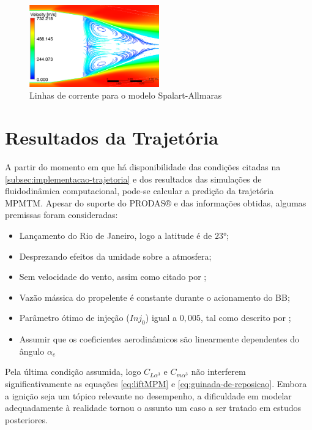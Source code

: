 \begin{figure}[!ht]
    \centering
    \includegraphics[width=0.5\textwidth]{corrente-velocidade-SPALART-2pol.png}
 	\caption{Linhas de corrente para o modelo Spalart-Allmaras}
    \label{fig:corrente-velocidade-bb-RANS}
\end{figure}

\section{Resultados da Trajetória}\label{sec:resultados-trajetoria}

A partir do momento em que há disponibilidade das condições citadas na \autoref{subsec:implementacao-trajetoria} e dos resultados das simulações de fluidodinâmica computacional, pode-se calcular a predição da trajetória MPMTM. Apesar do suporte do PRODAS® e das informações obtidas, algumas premissas foram consideradas:

\begin{itemize}
    \item Lançamento do Rio de Janeiro, logo a latitude é de $\ang{23}$;
    \item Desprezando efeitos da umidade sobre a atmosfera;
    \item Sem velocidade do vento, assim como citado por \citeauthor{Rosendo2020};
    \item Vazão mássica do propelente é constante durante o acionamento do BB;
    \item Parâmetro ótimo de injeção ($Inj_0$) igual a $0,005$, tal como descrito por \citeauthor{DAVENAS1993329};
    \item Assumir que os coeficientes aerodinâmicos são linearmente dependentes do ângulo $\alpha_{e}$
\end{itemize}

Pela última condição assumida, logo $C_{L\alpha^{3}}$ e $C_{m\alpha^{3}}$ não interferem significativamente as equações \ref{eq:liftMPM} e \ref{eq:guinada-de-reposicao}. Embora a ignição seja um tópico relevante no desempenho, a dificuldade em modelar adequadamente à realidade tornou o assunto um caso a ser tratado em estudos posteriores.

